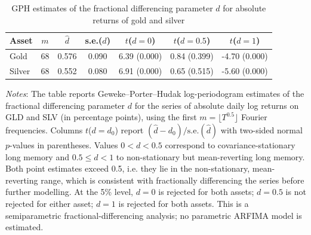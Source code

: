 \begin{table}[H]
  \centering
  \caption{GPH estimates of the fractional differencing parameter $d$ for absolute returns of gold and silver}
  \label{tab:arfima-gph}
  \begin{tabular}{lcccccc}
    \toprule
    Asset & $m$ & $\hat{d}$ & s.e.($\hat{d}$) & $t$($d=0$) & $t$($d=0.5$) & $t$($d=1$) \\
    \midrule
    Gold & 68 & 0.576 & 0.090 & 6.39 (0.000) & 0.84 (0.399) & -4.70 (0.000) \\
    Silver & 68 & 0.552 & 0.080 & 6.91 (0.000) & 0.65 (0.515) & -5.60 (0.000) \\
    \bottomrule
  \end{tabular}
  \vspace{0.2cm}
  \begin{minipage}{0.9\textwidth}
  \footnotesize
  \textit{Notes}: The table reports Geweke--Porter--Hudak log-periodogram estimates of the fractional differencing parameter $d$ for the series of absolute daily log returns on GLD and SLV (in percentage points), using the first $m = \lfloor T^{0.5} \rfloor$ Fourier frequencies. Columns $t$($d=d_0$) report $(\hat{d}-d_0)/\mathrm{s.e.}(\hat{d})$ with two-sided normal $p$-values in parentheses. Values $0 < d < 0.5$ correspond to covariance-stationary long memory and $0.5 \le d < 1$ to non-stationary but mean-reverting long memory. Both point estimates exceed 0.5, i.e. they lie in the non-stationary, mean-reverting range, which is consistent with fractionally differencing the series before further modelling. At the 5\% level, $d=0$ is rejected for both assets; $d=0.5$ is not rejected for either asset; $d=1$ is rejected for both assets. This is a semiparametric fractional-differencing analysis; no parametric ARFIMA model is estimated.
  \end{minipage}
\end{table}
